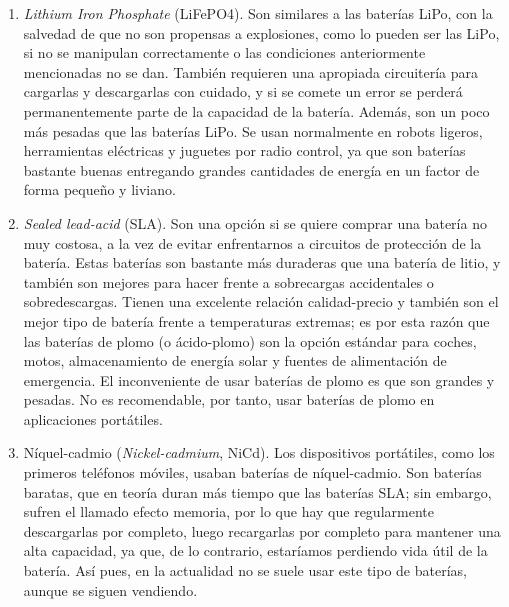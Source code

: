\documentclass[12pt]{article}
\begin{document}
\begin{enumerate}
		\item \textit{Lithium Iron Phosphate} (LiFePO4). Son similares a las baterías LiPo, con la salvedad de que no son propensas a explosiones, como lo pueden ser las LiPo, si no se manipulan correctamente o las condiciones anteriormente mencionadas no se dan. También requieren una apropiada circuitería para cargarlas y descargarlas con cuidado, y si se comete un error se perderá permanentemente parte de la capacidad de la batería. Además, son un poco más pesadas que las baterías LiPo. Se usan normalmente en robots ligeros, herramientas eléctricas y juguetes por radio control, ya que son baterías bastante buenas entregando grandes cantidades de energía en un factor de forma pequeño y liviano.
		
		\item \textit{Sealed lead-acid} (SLA). Son una opción si se quiere comprar una batería no muy costosa, a la vez de evitar enfrentarnos a circuitos de protección de la batería. Estas baterías son bastante más duraderas que una batería de litio, y también son mejores para hacer frente a sobrecargas accidentales o sobredescargas. Tienen una excelente relación calidad-precio y también son el mejor tipo de batería frente a temperaturas extremas; es por esta razón que las baterías de plomo (o ácido-plomo) son la opción estándar para coches, motos, almacenamiento de energía solar y fuentes de alimentación de emergencia. El inconveniente de usar baterías de plomo es que son grandes y pesadas. No es recomendable, por tanto, usar baterías de plomo en aplicaciones portátiles.
		
		\item Níquel-cadmio (\textit{Nickel-cadmium}, NiCd). Los dispositivos portátiles, como los primeros teléfonos móviles, usaban baterías de níquel-cadmio. Son baterías baratas, que en teoría duran más tiempo que las baterías SLA; sin embargo, sufren el llamado efecto memoria, por lo que hay que regularmente descargarlas por completo, luego recargarlas por completo para mantener una alta capacidad, ya que, de lo contrario, estaríamos perdiendo vida útil de la batería. Así pues, en la actualidad no se suele usar este tipo de baterías, aunque se siguen vendiendo.
		

\end{enumerate}
\end{document}
